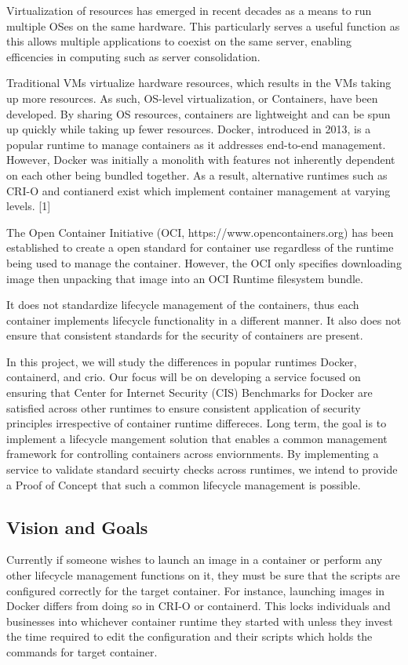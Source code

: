 Virtualization of resources has emerged in recent decades as a means to run multiple OSes on the same hardware. This particularly serves a useful function as this allows multiple applications to coexist on the same server, enabling efficencies in computing such as server consolidation.

Traditional VMs virtualize hardware resources, which results in the VMs taking up more resources. As such, OS-level virtualization, or Containers, have been developed. By sharing OS resources, containers are lightweight and can be spun up quickly while taking up fewer resources. Docker, introduced in 2013, is a popular runtime to manage containers as it addresses end-to-end management. However, Docker was initially a monolith with features not inherently dependent on each other being bundled together. As a result, alternative runtimes such as CRI-O and contianerd exist which implement container management at varying levels. [1]

The Open Container Initiative (OCI, https://www.opencontainers.org) has been established to create a open standard for container use regardless of the runtime being used to manage the container. However, the OCI only specifies downloading image then unpacking that image into an OCI Runtime filesystem bundle.

It does not standardize lifecycle management of the containers, thus each container implements lifecycle functionality in a different manner. It also does not ensure that consistent standards for the security of containers are present.

In this project, we will study the differences in popular runtimes Docker, containerd, and crio. Our focus will be on developing a service focused on ensuring that Center for Internet Security (CIS) Benchmarks for Docker are satisfied across other runtimes to ensure consistent application of security principles irrespective of container runtime differeces. Long term, the goal is to implement a lifecycle mangement solution that enables a common management framework for controlling containers across enviornments. By implementing a service to validate standard secuirty checks across runtimes, we intend to provide a Proof of Concept that such a common lifecycle management is possible.

\subsection{Vision and Goals}
Currently if someone wishes to launch an image in a container or perform any other lifecycle management functions on it, they must be sure that the scripts are configured correctly for the target container. For instance, launching images in Docker differs from doing so in CRI-O or containerd. This locks individuals and businesses into whichever container runtime they started with unless they invest the time required to edit the configuration and their scripts which holds the commands for target container.

